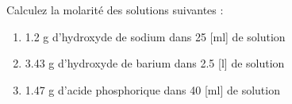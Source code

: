 \documentclass[
  11pt,
  a4paper,
  openany]{book}
\providecommand{\tightlist}{%
  \setlength{\itemsep}{0pt}\setlength{\parskip}{0pt}}
\begin{document}
\begin{Exercise}

Calculez la molarité des solutions suivantes :

\begin{enumerate}
\def\labelenumi{\arabic{enumi}.}
\tightlist
\item
  1.2 g d'hydroxyde de sodium dans 25 {[}ml{]} de solution
\item
  3.43 g d'hydroxyde de barium dans 2.5 {[}l{]} de solution
\item
  1.47 g d'acide phosphorique dans 40 {[}ml{]} de solution
\end{enumerate}

\end{Exercise}
\end{document}
